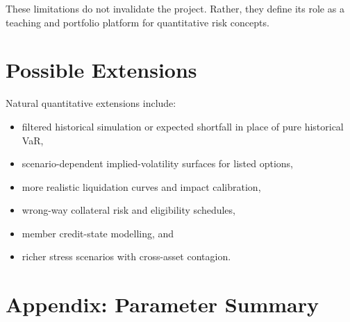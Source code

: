 \documentclass[11pt]{article}
\begin{document}
These limitations do not invalidate the project. Rather, they define its role as a teaching and portfolio platform for quantitative risk concepts.

\section{Possible Extensions}

Natural quantitative extensions include:

\begin{itemize}
    \item filtered historical simulation or expected shortfall in place of pure historical VaR,
    \item scenario-dependent implied-volatility surfaces for listed options,
    \item more realistic liquidation curves and impact calibration,
    \item wrong-way collateral risk and eligibility schedules,
    \item member credit-state modelling, and
    \item richer stress scenarios with cross-asset contagion.
\end{itemize}

\section{Appendix: Parameter Summary}
\end{document}
